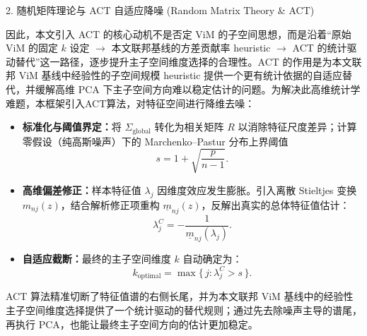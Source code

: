\documentclass[11pt,aspectratio=169]{beamer}
\begin{document}
  
\begin{frame}[t]{2. 随机矩阵理论与 ACT 自适应降噪 (Random Matrix Theory \& ACT)}
  \small
\par 因此，本文引入 ACT 的核心动机不是否定 ViM 的子空间思想，而是沿着“原始 ViM 的固定 $k$ 设定 $\rightarrow$ 本文联邦基线的方差贡献率 heuristic $\rightarrow$ ACT 的统计驱动替代”这一路径，逐步提升主子空间维度选择的合理性。ACT 的作用是为本文联邦 ViM 基线中经验性的子空间规模 heuristic 提供一个更有统计依据的自适应替代，并缓解高维 PCA 下主子空间方向难以稳定估计的问题。为解决此高维统计学难题，本框架引入ACT算法，对特征空间进行降维去噪：
  \begin{itemize}
    \item \textbf{标准化与阈值界定：}将 $\Sigma_{\mathrm{global}}$ 转化为相关矩阵 $R$ 以消除特征尺度差异；计算零假设（纯高斯噪声）下的 Marchenko--Pastur 分布上界阈值
    \[
      s = 1 + \sqrt{\frac{p}{n-1}}.
    \]
    \item \textbf{高维偏差修正：}样本特征值 $\lambda_j$ 因维度效应发生膨胀。引入离散 Stieltjes 变换 $m_{nj}(z)$，结合解析修正项重构 $\underline{m}_{nj}(z)$，反解出真实的总体特征值估计：
    \[
      \lambda_j^C = -\frac{1}{\underline{m}_{nj}(\lambda_j)}.
    \]
    \item \textbf{自适应截断：}最终的主子空间维度 $k$ 自动确定为：
    \[
      k_{\mathrm{optimal}} = \max \{\, j : \lambda_j^C > s \,\}.
    \]
  \end{itemize}

\par ACT 算法精准切断了特征值谱的右侧长尾，并为本文联邦 ViM 基线中的经验性主子空间维度选择提供了一个统计驱动的替代规则；通过先去除噪声主导的谱尾，再执行 PCA，也能让最终主子空间方向的估计更加稳定。
\end{frame}
\end{document}
